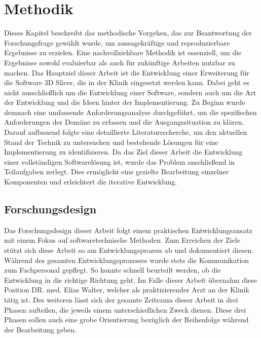 \chapter{Methodik}
\label{chap:methodik} Dieses Kapitel beschreibt das methodische Vorgehen, das
zur Beantwortung der Forschungsfrage gewählt wurde, um aussagekräftige und reproduzierbare
Ergebnisse zu erzielen. Eine nachvollziehbare Methodik ist essenziell, um die Ergebnisse
sowohl evaluierbar als auch für zukünftige Arbeiten nutzbar zu machen. Das
Hauptziel dieser Arbeit ist die Entwicklung einer Erweiterung für die Software
3D Slicer, die in der Klinik eingesetzt werden kann. Dabei geht es nicht
ausschließlich um die Entwicklung einer Software, sondern auch um die Art der Entwicklung
und die Ideen hinter der Implementierung. Zu Beginn wurde demnach eine
umfassende Anforderungsanalyse durchgeführt, um die spezifischen Anforderungen der
Domäne zu erfassen und die Ausgangssituation zu klären. Darauf aufbauend folgte
eine detaillierte Literaturrecherche, um den aktuellen Stand der Technik zu untersuchen
und bestehende Lösungen für eine Implementierung zu identifizieren. Da das Ziel
dieser Arbeit die Entwicklung einer vollständigen Softwarelösung ist, wurde das Problem
anschließend in Teilaufgaben zerlegt. Dies ermöglicht eine gezielte Bearbeitung
einzelner Komponenten und erleichtert die iterative Entwicklung.

\section{Forschungsdesign}
Das Forschungsdesign dieser Arbeit folgt einem praktischen Entwicklungsansatz
mit einem Fokus auf softwaretechnische Methoden. Zum Erreichen der Ziele stützt sich
diese Arbeit so am Entwicklungsprozess ab und dokumentiert diesen. Während des
gesamten Entwicklungsprozesses wurde stets die Kommunikation zum Fachpersonal
gepflegt. So konnte schnell beurteilt werden, ob die Entwicklung in die richtige
Richtung geht. Im Falle dieser Arbeit übernahm diese Position DR. med. Elias Walter,
welcher als praktizierender Arzt an der Klinik tätig ist. Des weiteren lässt sich
der gesamte Zeitraum dieser Arbeit in drei Phasen aufteilen, die jeweils einem
unterschiedlichen Zweck dienen. Diese drei Phasen sollen auch eine grobe Orientierung
bezüglich der Reihenfolge während der Bearbeitung geben.
\pagebreak


